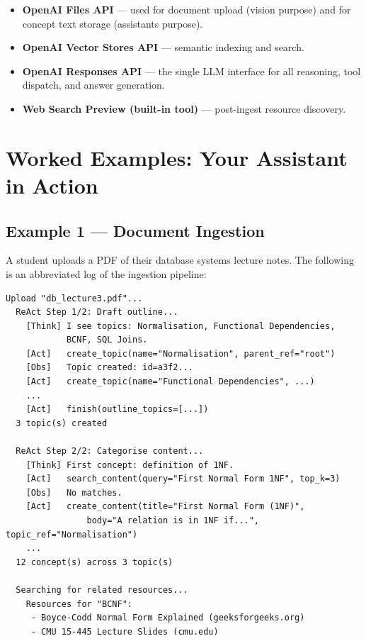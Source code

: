 \documentclass[12pt,a4paper]{article}
\begin{document}
\begin{itemize}[leftmargin=*]
  \item \textbf{OpenAI Files API} --- used for document upload (vision
        purpose) and for concept text storage (assistants purpose).
  \item \textbf{OpenAI Vector Stores API} --- semantic indexing and search.
  \item \textbf{OpenAI Responses API} --- the single LLM interface for all
        reasoning, tool dispatch, and answer generation.
  \item \textbf{Web Search Preview (built-in tool)} --- post-ingest resource
        discovery.
\end{itemize}

\section{Worked Examples: Your Assistant in Action}

\subsection{Example 1 --- Document Ingestion}

A student uploads a PDF of their database systems lecture notes. The
following is an abbreviated log of the ingestion pipeline:

\begin{lstlisting}[language={},numbers=none]
  Upload "db_lecture3.pdf"...
  ReAct Step 1/2: Draft outline...
    [Think] I see topics: Normalisation, Functional Dependencies,
            BCNF, SQL Joins.
    [Act]   create_topic(name="Normalisation", parent_ref="root")
    [Obs]   Topic created: id=a3f2...
    [Act]   create_topic(name="Functional Dependencies", ...)
    ...
    [Act]   finish(outline_topics=[...])
  3 topic(s) created

  ReAct Step 2/2: Categorise content...
    [Think] First concept: definition of 1NF.
    [Act]   search_content(query="First Normal Form 1NF", top_k=3)
    [Obs]   No matches.
    [Act]   create_content(title="First Normal Form (1NF)",
                body="A relation is in 1NF if...", topic_ref="Normalisation")
    ...
  12 concept(s) across 3 topic(s)

  Searching for related resources...
    Resources for "BCNF":
     - Boyce-Codd Normal Form Explained (geeksforgeeks.org)
     - CMU 15-445 Lecture Slides (cmu.edu)
\end{lstlisting}
\end{document}
